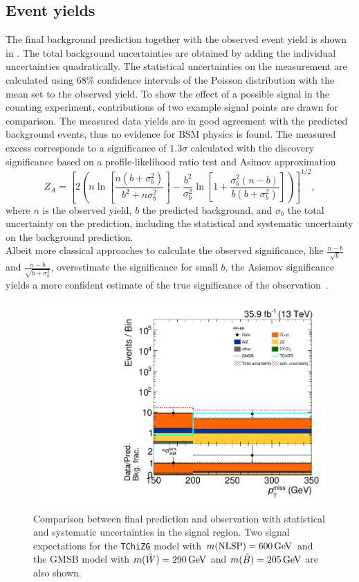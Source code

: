 \subsection*{Event yields}
The final background prediction together with the observed event yield is shown in .
The total background uncertainties are obtained by adding the individual uncertainties quadratically. The statistical uncertainties on the measurement are calculated using $68\%$ confidence intervals of the Poisson distribution with the mean set to the observed yield.
To show the effect of a possible signal in the counting experiment, contributions of two example signal points are drawn for comparison. The measured data yields are in good agreement with the predicted background events, thus no evidence for BSM physics is found. The measured excess corresponds to a significance of $1.3\sigma$ calculated with the discovery significance based on a profile-likelihood ratio test and Asimov approximation~\cite{Significance2}
\begin{equation}
 Z_A = \left[ 2\left( n\ln{\left[\frac{n(b+\sigma_{b}^2)}{b^2+n\sigma_{b}^2}\right]} -\frac{b^2}{\sigma_{b}^2} \ln \left[1+\frac{\sigma_b ^2 (n-b)}{b(b+\sigma_b ^2)} \right]  \right)    \right]^{1/2},
\end{equation}
where $n$ is the observed yield, $b$ the predicted background, and $\sigma_{b}$ the total uncertainty on the prediction, including the statistical and systematic uncertainty on the background prediction.\\
Albeit more classical approaches to calculate the observed significance, like $\frac{n-b}{\sqrt{b}}$ and $\frac{n-b}{\sqrt{b+\sigma_b^2}}$, overestimate the significance for small $b$, the Asismov significance yields a more confident estimate of the true significance of the observation~\cite{Significance}.
\begin{figure}[tbp]
 \centering
 \includegraphics[width=\pairwidth]{figures/EndorsementPlots/final_MC_log}
 \caption{Comparison between final prediction and observation with statistical and systematic uncertainties in the signal region. Two signal expectations for the \texttt{TChiZG} model with $m(\text{NLSP})=600\,\text{Ge\hspace{-.08em}V}$ and the GMSB model with $m(\tilde{W})=290\,\text{Ge\hspace{-.08em}V}$ and $m(\tilde{B})=205\,\text{Ge\hspace{-.08em}V}$ are also shown.}
 \label{fig:result}
\end{figure}
